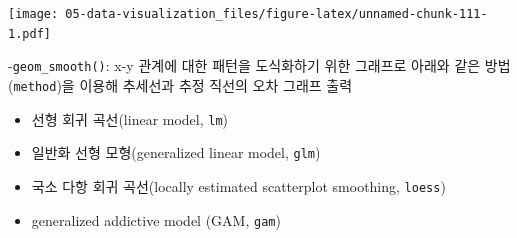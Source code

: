 \documentclass[
  11pt,
]{krantz}
\providecommand{\tightlist}{%
  \setlength{\itemsep}{0pt}\setlength{\parskip}{0pt}}
\begin{document}
\normalsize

\footnotesize

\texttt{[image: 05-data-visualization\_files/figure-latex/unnamed-chunk-111-1.pdf]}

\normalsize

-\texttt{geom\_smooth()}: x-y 관계에 대한 패턴을 도식화하기 위한 그래프로 아래와 같은 방법(\texttt{method})을 이용해 추세선과 추정 직선의 오차 그래프 출력

\begin{itemize}
\tightlist
\item
  선형 회귀 곡선(linear model, \texttt{lm})
\item
  일반화 선형 모형(generalized linear model, \texttt{glm})
\item
  국소 다항 회귀 곡선(locally estimated scatterplot smoothing, \texttt{loess})
\item
  generalized addictive model (GAM, \texttt{gam})
\end{itemize}

\footnotesize
\end{document}
